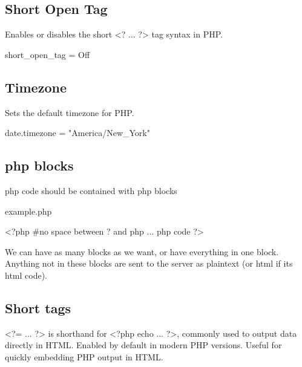 \documentclass{report}
\begin{document}
    \subsection{Short Open Tag}
    \bigbreak \noindent 
    Enables or disables the short <? ... ?> tag syntax in PHP.
    \bigbreak \noindent 
    \begin{phpcode}
    short_open_tag = Off
    \end{phpcode}
    \bigbreak \noindent 
    \subsection{Timezone}
    \bigbreak \noindent 
    Sets the default timezone for PHP.
    \bigbreak \noindent 
    \begin{phpcode}
    date.timezone = "America/New_York"
    \end{phpcode}





    \pagebreak 
    \bigbreak \noindent 
    \subsection{php blocks}
    \bigbreak \noindent 
    php code should be contained with php blocks
    \bigbreak \noindent 
    \begin{phpcode}
    example.php

    <?php #no space between ? and php
        ... php code
    ?>
    \end{phpcode}
    \bigbreak \noindent 
    We can have as many blocks as we want, or have everything in one block. Anything not in these blocks are sent to the server as plaintext (or html if its html code).
    \bigbreak \noindent 
    \subsection{Short tags}
    \bigbreak \noindent 
    <?= ... ?> is shorthand for <?php echo ... ?>, commonly used to output data directly in HTML.
    \bigbreak \noindent 
    Enabled by default in modern PHP versions.
    \bigbreak \noindent 
    Useful for quickly embedding PHP output in HTML.
    \bigbreak \noindent 

    \bigbreak \noindent 
\end{document}
